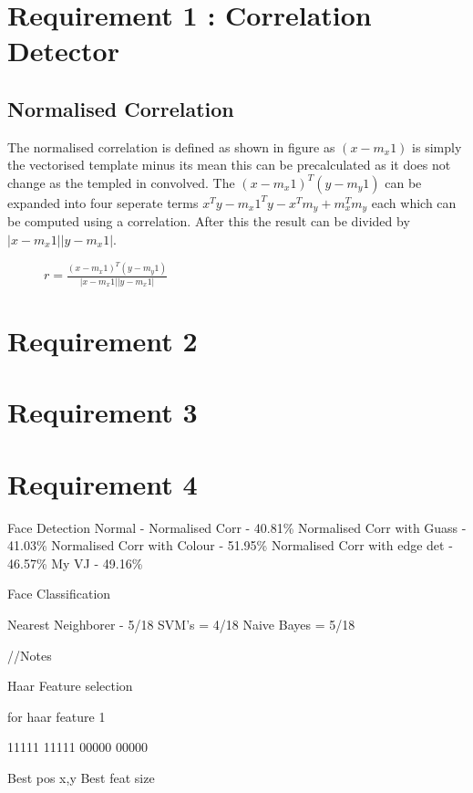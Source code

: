 

\section{Requirement 1 : Correlation Detector}

\subsection{Normalised Correlation}

The normalised correlation is defined as shown in figure as $(x-m_x1)$ is simply
the vectorised template minus its mean this can be precalculated as it does not
change as the templed in convolved. The $(x-m_x1)^T(y-m_y1)$ can be expanded into
four seperate terms $x^Ty - m_x1^Ty - x^Tm_y + m_x^Tm_y$ each which can be computed
using a correlation. After this the result can be divided by $|x-m_x1||y-m_x1|$.


\begin{figure}
$r=\frac{(x-m_x1)^T(y-m_y1)}{|x-m_x1||y-m_x1|}$
\end{figure}

\section{Requirement 2}

\section{Requirement 3}

\section{Requirement 4}

Face Detection
Normal -
Normalised Corr - 40.81\%
Normalised Corr with Guass - 41.03\%
Normalised Corr with Colour - 51.95\%
Normalised Corr with edge det - 46.57\%
My VJ - 49.16\%

Face Classification

Nearest Neighborer - 5/18
SVM's = 4/18
Naive Bayes = 5/18




//Notes

Haar Feature selection

for haar feature 1

11111
11111
00000
00000

Best pos x,y
Best feat size